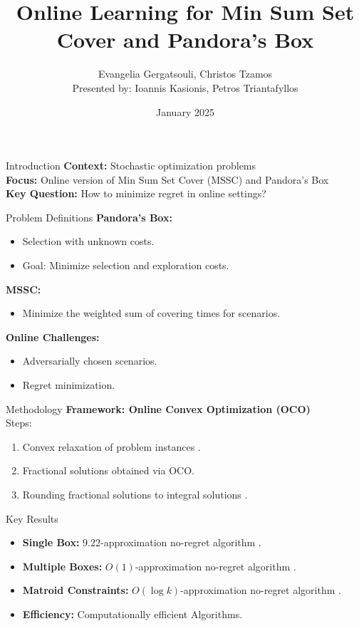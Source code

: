 \documentclass{beamer}
\title[Online Learning]{Online Learning for Min Sum Set Cover and Pandora's Box}
\author{Evangelia Gergatsouli, Christos Tzamos \\ Presented by: Ioannis Kasionis, Petros Triantafyllos}
\date{January 2025}
\begin{document}
\begin{frame}
  \titlepage
\end{frame}

\begin{frame}{Introduction}
\textbf{Context:} Stochastic optimization problems\\
\textbf{Focus:} Online version of Min Sum Set Cover (MSSC) and Pandora's Box\\
\textbf{Key Question:} How to minimize regret in online settings?
\end{frame}

\begin{frame}{Problem Definitions}
\textbf{Pandora’s Box:}
\begin{itemize}
    \item Selection with unknown costs.
    \item Goal: Minimize selection and exploration costs.
\end{itemize}
\textbf{MSSC:}
\begin{itemize}
    \item Minimize the weighted sum of covering times for scenarios.
\end{itemize}
\textbf{Online Challenges:}
\begin{itemize}
    \item Adversarially chosen scenarios.
    \item Regret minimization.
\end{itemize}
\end{frame}

\begin{frame}{Methodology}
\textbf{Framework: Online Convex Optimization (OCO)} \cite{shalev2007primal}\\
Steps:
\begin{enumerate}
    \item Convex relaxation of problem instances \cite{flaxman2004online}.
    \item Fractional solutions obtained via OCO.
    \item Rounding fractional solutions to integral solutions \cite{bansal2010constant}.
\end{enumerate}
\end{frame}

\begin{frame}{Key Results}
\begin{itemize}
    \item \textbf{Single Box:} 9.22-approximation no-regret algorithm \cite{gergatsouli2022online}.
    \item \textbf{Multiple Boxes:} $O(1)$-approximation no-regret algorithm \cite{gergatsouli2022online}.
    \item \textbf{Matroid Constraints:} $O(\log k)$-approximation no-regret algorithm \cite{gergatsouli2022online}.
    \item \textbf{Efficiency:} Computationally efficient Algorithms.
\end{itemize}
\end{frame}
\end{document}
